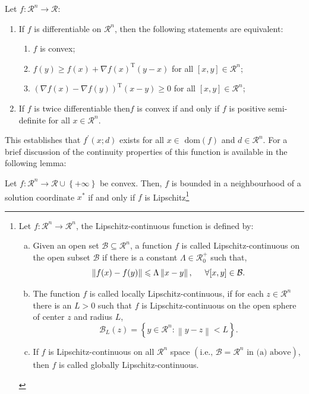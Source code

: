 \begin{enumerate}[i)]
\begin{thm}\label{Theorem_Convex3}
   Let $f:\mathcal{R}^{n}\rightarrow\mathcal{R}$:
     \begin{enumerate}
        \item If $f$ is differentiable on $\mathcal{R}^{n}$, then the following statements are equivalent:
             \begin{enumerate}
                 \item $f$ is convex;
                 \item $f(y)\ge f(x)+\nabla f(x)^{\text{T}}\left(y-x\right)$ for all $[x,y]\in\mathcal{R}^{n}$;
                 \item $\left(\nabla f(x)-\nabla f(y)\right)^{\text{T}}(x-y) \ge 0$ for all $[x,y]\in\mathcal{R}^{n}$;
             \end{enumerate}
        \item If $f$ is twice differentiable then$f$ is convex if and only if $f$ is positive semi-definite for all $x\in\mathcal{R}^{n}$.
     \end{enumerate}
\end{thm}

This establishes that $f^{\prime}\left(x;d\right)$ exists for all $x\in\text{ dom}(f)$ and $d\in\mathcal{R}^{n}$. For a brief discussion of the continuity properties of this function is available in the following lemma:
\begin{lem}
    Let $f:\mathcal{R}^{n}\rightarrow\mathcal{R}\cup\left\{+\infty\right\}$ be convex. Then, $f$ is bounded in a neighbourhood of a solution coordinate $x^{\ast}$ if and only if $f$ is Lipschitz\footnote{
Let $f:\mathcal{R}^{n}\rightarrow\mathcal{R}^{n}$, the Lipschitz-continuous function is defined by:
    \begin{enumerate}[(a)]
       \item Given an open set $\mathcal{B}\subseteq\mathcal{R}^{n}$, a function $f$ is called Lipschitz-continuous on the open subset $\mathcal{B}$ if there is a constant $\Lambda\in\mathcal{R}_{0}^{+}$ such that,
           \begin{displaymath}
               \left\|f(x)-f(y)\right\| \le  \Lambda\left\|x-y\right\|, \hspace{.5cm} \forall[x,y]\in\mathcal{B}.
           \end{displaymath}
       \item The function $f$ is called locally Lipschitz-continuous, if for each $z\in\mathcal{R}^{n}$ there is an $L>0$ such that $f$ is Lipschitz-continuous on the open sphere of center $z$ and radius $L$,
           \begin{displaymath}
              \mathcal{B}_{L}(z) = \left\{y\in\mathcal{R}^{n} :\left\|y-z\right\| < L\right\}.
           \end{displaymath}
       \item If $f$ is Lipschitz-continuous on all $\mathcal{R}^{n}$ space $\left(\text{i.e., }\mathcal{B}=\mathcal{R}^{n}\text{ in (a) above}\right)$, then $f$ is called globally Lipschitz-continuous.


\end{enumerate}}
\end{lem}
\end{enumerate}

